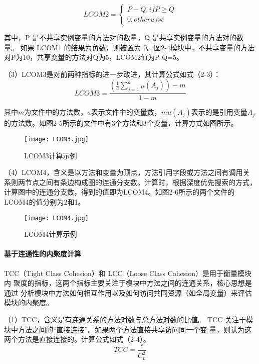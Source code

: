 \begin{equation}
    {LCOM2}=\left\{
        \begin{array}
        {c}P-Q,  ifP\geq Q \\
        0,  otherwise
        \end{array}\right.
\end{equation}

其中，P 是不共享实例变量的方法对的数量，Q 是共享实例变量的方法对的数量。
如果 LCOM1 的结果为负数，则被置为 0。图2-4模块中，不共享变量的方法对P为10，共享变量的方法对Q为5，LCOM2值为P-Q=5。

（3）LCOM3是对前两种指标的进一步改进，其计算公式如式（2-3）：
\begin{equation}
LCOM3 = \frac{\left( \frac{1}{a} \sum_{j=1}^a \mu(A_j) \right) - m}{1 - m}
\end{equation}

其中\( m\)为文件中的方法数，\( a\)表示文件中的变量数，\( mu(A_j)\)表示的是引用变量\(A_j\)的方法数。如图2-5所示的文件中有3个方法和3个变量，计算方式如图所示。
\begin{figure}[h]
\centering
\texttt{[image: LCOM3.jpg]}
\caption{LCOM3计算示例}
\end{figure}



（4）LCOM4，含义是以方法和变量为顶点，方法引用字段或方法之间有调用关系则两节点之间有条边构成图的连通分支数\cite{1995Measuring}。计算时，根据深度优先搜索的方式，计算图中的连通分支数，得到的值即为LCOM4。如图2-6所示的两个文件的LCOM4的值分别为2和1。

\begin{figure}[h]
\centering
\texttt{[image: LCOM4.jpg]}
\caption{LCOM4计算示例}
\end{figure}


\paragraph{基于连通性的内聚度计算} TCC（Tight Class Cohesion）和 LCC（Loose Class Cohesion）是用于衡量模块内
聚度的指标，这两个指标主要关注于模块中方法之间的连通关系，核心思想是通过
分析模块中方法如何相互作用以及如何访问共同资源（如全局变量）来评估模块的内聚度。

（1）TCC，含义是有连通关系的方法对数与总方法对数的比值\cite{1995Cohesion}。
TCC 关注于模块中方法之间的“直接连接”。如果两个方法直接共享访问同一个变
量，则认为这两个方法是直接连接的。计算公式如式（2-4）。
\begin{equation}
{TCC} = \frac{e}{C_{n}^{2}}
\end{equation}

